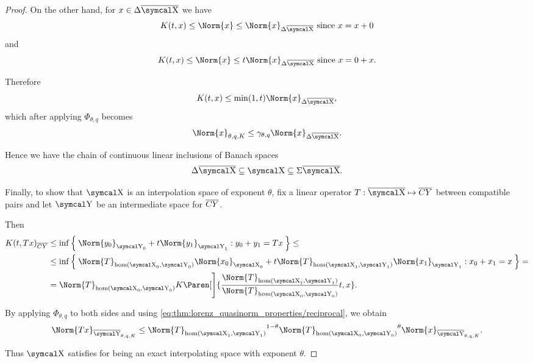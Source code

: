 \begin{proof}
  On the other hand, for \( x \in \Delta \Ol{\CX} \) we have
  \begin{equation*}
    K(t, x) \leq \Norm{x} \leq \Norm{x}_{\Delta \Ol{\CX}} \T{since} x = x + 0
  \end{equation*}
  and
  \begin{equation*}
    K(t, x) \leq \Norm{x} \leq t \Norm{x}_{\Delta \Ol{\CX}} \T{since} x = 0 + x.
  \end{equation*}

  Therefore
  \begin{equation*}
    K(t, x) \leq \min(1, t) \Norm{x}_{\Delta \Ol{\CX}},
  \end{equation*}
  which after applying \( \Phi_{\theta,q} \) becomes
  \begin{equation*}
    \Norm{x}_{\theta,q,K} \leq \gamma_{\theta,q} \Norm{x}_{\Delta \Ol{\CX}}.
  \end{equation*}

  Hence we have the chain of continuous linear inclusions of Banach spaces
  \begin{equation*}
    \Delta \Ol{\CX} \subseteq \CX \subseteq \Sigma \Ol{\CX}.
  \end{equation*}

  Finally, to show that \( \CX \) is an interpolation space of exponent \( \theta \), fix a linear operator \( T: \Ol{\CX} \mapsto \Ol{CY} \) between compatible pairs and let \( \CY \) be an intermediate space for \( \overline{CY} \).

  Then
  \begin{align*}
    K(t, Tx)_{\Ol{CY}}
    &\leq
    \inf \Set{ \Norm{y_0}_{\CY_0} + t \Norm{y_1}_{\CY_1} : y_0 + y_1 = Tx }
    \leq \\ &\leq
    \inf \Set{ \Norm{T}_{\hom(\CX_0, \CY_0)} \Norm{x_0}_{\CX_0} + t \Norm{T}_{\hom(\CX_1, \CY_1)} \Norm{x_1}_{\CY_1} : x_0 + x_1 = x }
    = \\ &=
    \Norm{T}_{\hom(\CX_0, \CY_0)} K\Paren[\Bigg]{\frac {\Norm{T}_{\hom(\CX_1, \CY_1)}} {\Norm{T}_{\hom(\CX_0, \CY_0)}} t, x}.
  \end{align*}

  By applying \( \Phi_{\theta,q} \) to both sides and using \eqref{eq:thm:lorenz_quasinorm_properties/reciprocal}, we obtain
  \begin{equation*}
    \Norm{Tx}_{\Ol{\CY}_{\theta,q,K}}
    \leq
    {\Norm{T}_{\hom(\CX_1, \CY_1)}}^{1 - \theta} {\Norm{T}_{\hom(\CX_0, \CY_0)}}^{\theta} \Norm{x}_{\Ol{\CY}_{\theta,q,K}}.
  \end{equation*}

  Thus \( \CX \) satisfies  for being an exact interpolating space with exponent \( \theta \).
\end{proof}

